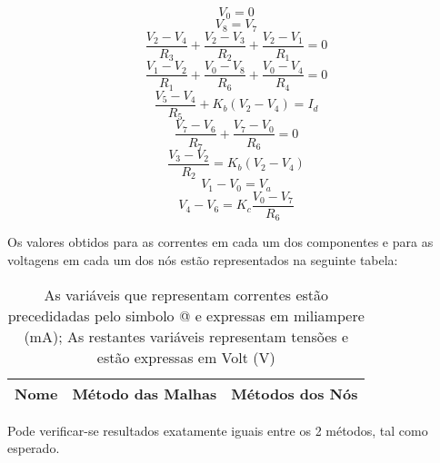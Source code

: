 \begin {equation}
	V_0 = 0
	\label{eq1}
\end{equation}
\begin {equation}
	V_8 = V_7
	\label{eqn}
\end{equation}
\begin {equation}
	\frac{V_2-V_4}{R_3} + \frac{V_2-V_3}{R_2} + \frac{V_2-V_1}{R_1} = 0
	\label{eq4}
\end{equation}
\begin {equation}
	\frac{V_1-V_2}{R_1} + \frac{V_0 - V_8}{R_6} + \frac{V_0 - V_4}{R_4} = 0
	\label{eq3}
\end{equation}
\begin {equation}
	\frac{V_5-V_4}{R_5} + K_b(V_2-V_4) = I_d
	\label{eq6}

\end{equation}
\begin {equation}
	\frac{V_7-V_6}{R_7} + \frac{V_7 - V_0}{R_6} = 0
	\label{eq7}
\end{equation}
\begin {equation}
	\frac{V_3-V_2}{R_2} = K_b(V_2-V_4) 
	\label{eq5}
\end{equation}
\begin {equation}
	V_1 - V_0 = V_a
	\label{eq8}
\end{equation}
\begin {equation}
	V_4 - V_6 = K_c \frac{V_0 - V_7}{R_6}
	\label{eq9}
\end{equation}

Os valores obtidos para as correntes em cada um dos componentes e para as voltagens em cada um dos nós estão representados na seguinte tabela:
 \pagebreak 
\begin{table}[h]
  \centering
  \begin{tabular}{|l|r|r|}
    \hline    
    {\bf Nome} & {\bf Método das Malhas} & {\bf Métodos dos Nós}\\ \hline
    
  \end{tabular}
  \caption{As variáveis que representam correntes estão precedidadas pelo simbolo @ e expressas em miliampere (mA); As restantes variáveis representam tensões e estão expressas em Volt (V)}
  \label{tab:valores_teoricos}
\end{table}

Pode verificar-se resultados exatamente iguais entre os 2 métodos, tal como esperado.


